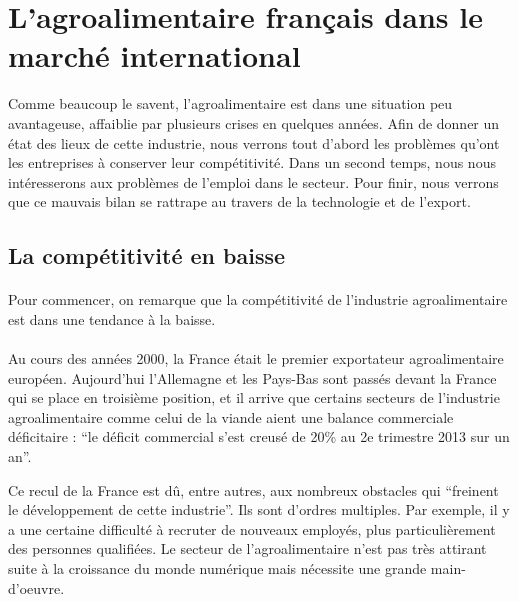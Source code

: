 \documentclass[a4paper,12pt]{report}
\begin{document}
	\section{L’agroalimentaire français dans le marché international}
		Comme beaucoup le savent, l’agroalimentaire est dans une situation peu avantageuse, affaiblie par plusieurs crises en quelques années. Afin de donner un état des lieux de cette industrie, nous verrons tout d’abord les problèmes qu’ont les entreprises à conserver leur compétitivité. Dans un second temps, nous nous intéresserons aux problèmes de l’emploi dans le secteur. Pour finir, nous verrons que ce mauvais bilan se rattrape au travers de la technologie et de l’export.

		\subsection{La compétitivité en baisse}
			\paragraph{}Pour commencer, on remarque que la compétitivité de l’industrie agroalimentaire est dans une tendance à la baisse.
			
			\paragraph{}Au cours des années 2000, la France était le premier exportateur agroalimentaire européen. Aujourd'hui l’Allemagne et les Pays-Bas sont passés devant la France qui se place en troisième position, et il arrive que certains secteurs de l’industrie agroalimentaire comme celui de la viande aient une balance commerciale déficitaire : “le déficit commercial s'est creusé de 20\% au 2e trimestre 2013 sur un an”\cite{DeficitCommercialViandeAggrave}.

			Ce recul de la France est dû, entre autres, aux nombreux obstacles qui “freinent le développement de cette industrie”\cite{StimulerCompetitiviteEntreprises}. Ils sont d’ordres multiples. Par exemple, il y a une certaine difficulté à recruter de nouveaux employés, plus particulièrement des personnes qualifiées. Le secteur de l’agroalimentaire n’est pas très attirant suite à la croissance du monde numérique mais nécessite une grande main-d’oeuvre.
\end{document}
